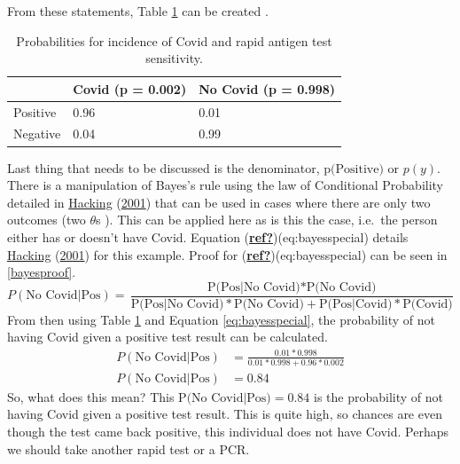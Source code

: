 \documentclass[12pt,twoside]{reedthesis}
\begin{document}
From these statements, Table \ref{tab:makingcovid} can be created .
\begin{table}[H]

\caption{\label{tab:makingcovid}\label{tab:makingcovid}Probabilities for incidence of Covid and rapid antigen test sensitivity.}
\centering
\begin{tabular}[t]{lll}
\toprule
  & Covid (p = 0.002) & No Covid (p = 0.998)\\
\midrule
Positive & 0.96 & 0.01\\
Negative & 0.04 & 0.99\\
\bottomrule
\end{tabular}
\end{table}
Last thing that needs to be discussed is the denominator, \(\text{p(Positive)}\) or \(p(y)\). There is a manipulation of Bayes's rule using the law of Conditional Probability detailed in \protect\hyperlink{ref-hackingIntroductionProbabilityInductive2001}{Hacking} (\protect\hyperlink{ref-hackingIntroductionProbabilityInductive2001}{2001}) that can be used in cases where there are only two outcomes (two \(\theta\)s ). This can be applied here as is this the case, i.e.~the person either has or doesn't have Covid. Equation (\protect\hyperlink{ref-ref}{\textbf{ref?}})(eq:bayesspecial) details \protect\hyperlink{ref-hackingIntroductionProbabilityInductive2001}{Hacking} (\protect\hyperlink{ref-hackingIntroductionProbabilityInductive2001}{2001}) for this example. Proof for (\protect\hyperlink{ref-ref}{\textbf{ref?}})(eq:bayesspecial) can be seen in \ref{bayesproof}.
\begin{equation}
P(\text{No Covid|Pos}) = \frac{\text{P(Pos|No Covid)} * \text{P(No Covid)}}{\text{P(Pos|No Covid)} * \text{P(No Covid)} + \text{P(Pos|Covid)} * \text{P(Covid)}}
\label{eq:bayesspecial}
\end{equation}
From then using Table \ref{tab:makingcovid} and Equation \eqref{eq:bayesspecial}, the probability of not having Covid given a positive test result can be calculated.
\begin{align}
P(\text{No Covid|Pos}) &= \frac{0.01 * 0.998}{0.01 * 0.998 + 0.96 * 0.002} \\
P(\text{No Covid|Pos}) &= 0.84
\label{eq:bayesmath2}
\end{align}
So, what does this mean? This \(\text{P(No Covid|Pos)} = 0.84\) is the probability of not having Covid given a positive test result. This is quite high, so chances are even though the test came back positive, this individual does not have Covid. Perhaps we should take another rapid test or a PCR.
\end{document}
